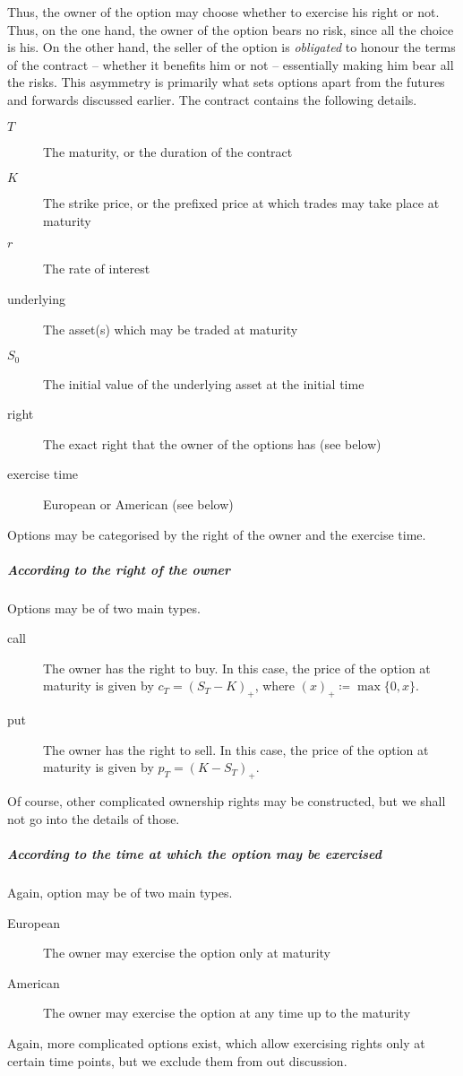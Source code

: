 Thus, the owner of the option may choose whether to exercise his right or not. Thus, on the one hand, the owner of the option bears no risk, since all the choice is his. On the other hand, the seller of the option is \emph{obligated} to honour the terms of the contract -- whether it benefits him or not -- essentially making him bear all the risks. This asymmetry is primarily what sets options apart from the futures and forwards discussed earlier.
The contract contains the following details.
\begin{description}
	\item[$ T $] The maturity, or the duration of the contract
	\item[$ K $] The strike price, or the prefixed price at which trades may take place at maturity
	\item[$ r $] The rate of interest
	\item[underlying] The asset(s) which may be traded at maturity
	\item[$ S_0 $] The initial value of the underlying asset at the initial time
	\item[right] The exact right that the owner of the options has (see below)
	\item[exercise time] European or American (see below)
\end{description}

Options may be categorised by the right of the owner and the exercise time.

\subparagraph{According to the right of the owner}  Options may be of two main types.
\begin{description}
	\item[call] The owner has the right to buy. In this case, the price of the option at maturity is given by $ c_T = (S_T - K)_+ $, where $ (x)_+ \coloneqq \max \{ 0, x \} $.
	\item[put] The owner has the right to sell. In this case, the price of the option at maturity is given by $ p_T = (K - S_T)_+ $.
\end{description}
Of course, other complicated ownership rights may be constructed, but we shall not go into the details of those.

\subparagraph{According to the time at which the option may be exercised}  Again, option may be of two main types.
\begin{description}
	\item[European] The owner may exercise the option only at maturity
	\item[American] The owner may exercise the option at any time up to the maturity
\end{description}
Again, more complicated options exist, which allow exercising rights only at certain time points, but we exclude them from out discussion.

